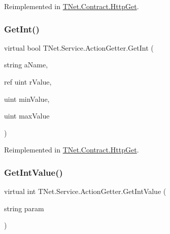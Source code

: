 Reimplemented in \mbox{\hyperlink{class_t_net_1_1_contract_1_1_http_get_afc5643a06ceca6ecba924888768a15c2}{T\+Net.\+Contract.\+Http\+Get}}.

\mbox{\label{class_t_net_1_1_service_1_1_action_getter_a32dcd451275e8f7fe20e711ceac96f4b}} 
\subsubsection{\texorpdfstring{Get\+Int()}{GetInt()}\hspace{0.1cm}{\footnotesize\ttfamily [5/5]}}
{\footnotesize\ttfamily virtual bool T\+Net.\+Service.\+Action\+Getter.\+Get\+Int (\begin{DoxyParamCaption}\item[{string}]{a\+Name,  }\item[{ref uint}]{r\+Value,  }\item[{uint}]{min\+Value,  }\item[{uint}]{max\+Value }\end{DoxyParamCaption})\hspace{0.3cm}{\ttfamily [virtual]}}







Reimplemented in \mbox{\hyperlink{class_t_net_1_1_contract_1_1_http_get_aecdcc5039a14e65f1b7caad8667fa212}{T\+Net.\+Contract.\+Http\+Get}}.

\mbox{\label{class_t_net_1_1_service_1_1_action_getter_a257e2a314405806db29aa204371c3ced}} 
\subsubsection{\texorpdfstring{Get\+Int\+Value()}{GetIntValue()}\hspace{0.1cm}{\footnotesize\ttfamily [1/2]}}
{\footnotesize\ttfamily virtual int T\+Net.\+Service.\+Action\+Getter.\+Get\+Int\+Value (\begin{DoxyParamCaption}\item[{string}]{param }\end{DoxyParamCaption})\hspace{0.3cm}{\ttfamily [virtual]}}






